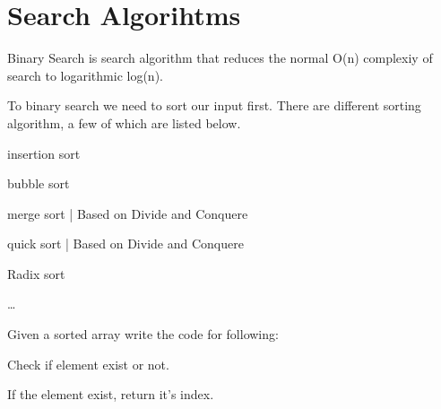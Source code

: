 \chapter{Search Algorihtms}{\label{ch:binary_search}}

Binary Search is search algorithm that reduces the normal O(n) complexiy of search to logarithmic log(n).

To binary search we need to sort our input first. There are different sorting algorithm, a few of which are listed below.
\begin{compactenum}
    \item insertion sort
    \item bubble sort
    \item merge sort | Based on Divide and Conquere
    \item quick sort | Based on Divide and Conquere
    \item Radix sort
    \item \dots
\end{compactenum}

\begin{exercise}
    Given a sorted array write the code for following:
    \lipsum[3]
   \begin{compactenum}
        \item Check if element exist or not.
        \item If the element exist, return it's index.
        \item 
   \end{compactenum}
\end{exercise}

